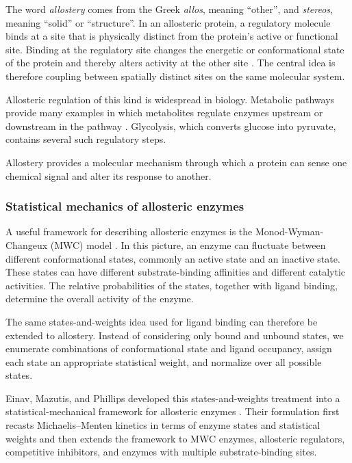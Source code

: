 
The word \emph{allostery} comes from the Greek \emph{allos}, meaning ``other'', and \emph{stereos}, meaning ``solid'' or ``structure''.
In an allosteric protein, a regulatory molecule binds at a site that is physically distinct from the protein's active or functional site.
Binding at the regulatory site changes the energetic or conformational state of the protein and thereby alters activity at the other site \cite{monod1963allosteric}.
The central idea is therefore coupling between spatially distinct sites on the same molecular system.

Allosteric regulation of this kind is widespread in biology.
Metabolic pathways provide many examples in which metabolites regulate enzymes upstream or downstream in the pathway \cite{monod1963allosteric}.
Glycolysis, which converts glucose into pyruvate, contains several such regulatory steps.

Allostery provides a molecular mechanism through which a protein can sense one chemical signal and alter its response to another.

\subsubsection{Statistical mechanics of allosteric enzymes}

A useful framework for describing allosteric enzymes is the Monod-Wyman-Changeux (MWC) model \cite{monod1965nature}.
In this picture, an enzyme can fluctuate between different conformational states, commonly an active state and an inactive state.
These states can have different substrate-binding affinities and different catalytic activities.
The relative probabilities of the states, together with ligand binding, determine the overall activity of the enzyme.

The same states-and-weights idea used for ligand binding can therefore be extended to allostery.
Instead of considering only bound and unbound states, we enumerate combinations of conformational state and ligand occupancy, assign each state an appropriate statistical weight, and normalize over all possible states.

Einav, Mazutis, and Phillips developed this states-and-weights treatment into a statistical-mechanical framework for allosteric enzymes \cite{einav2016statistical}.
Their formulation first recasts Michaelis--Menten kinetics in terms of enzyme states and statistical weights and then extends the framework to MWC enzymes, allosteric regulators, competitive inhibitors, and enzymes with multiple substrate-binding sites.